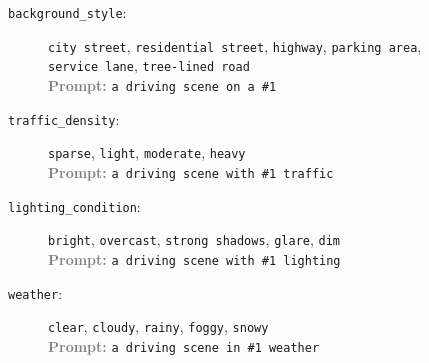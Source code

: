 \begin{figure}[htbp]
\begin{tcolorbox}
\begin{description}
    \item[\texttt{background\_style}:] \texttt{city street}, \texttt{residential street}, \texttt{highway}, \texttt{parking area}, \texttt{service lane}, \texttt{tree-lined road} \\
    \textcolor{gray}{\textbf{Prompt:}} \texttt{a driving scene on a \#1}

    \item[\texttt{traffic\_density}:] \texttt{sparse}, \texttt{light}, \texttt{moderate}, \texttt{heavy} \\
    \textcolor{gray}{\textbf{Prompt:}} \texttt{a driving scene with \#1 traffic}

    \item[\texttt{lighting\_condition}:] \texttt{bright}, \texttt{overcast}, \texttt{strong shadows}, \texttt{glare}, \texttt{dim} \\
    \textcolor{gray}{\textbf{Prompt:}} \texttt{a driving scene with \#1 lighting}

    \item[\texttt{weather}:] \texttt{clear}, \texttt{cloudy}, \texttt{rainy}, \texttt{foggy}, \texttt{snowy} \\
    \textcolor{gray}{\textbf{Prompt:}} \texttt{a driving scene in \#1 weather}
\end{description}
\end{tcolorbox}
\end{figure}

